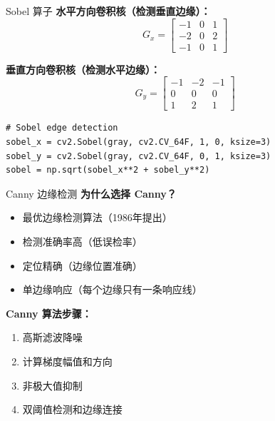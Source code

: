 \begin{frame}[fragile]{Sobel 算子}
    \textbf{水平方向卷积核（检测垂直边缘）：}
    $$
    G_x = \begin{bmatrix}
    -1 & 0 & 1 \\
    -2 & 0 & 2 \\
    -1 & 0 & 1
    \end{bmatrix}
    $$

    \textbf{垂直方向卷积核（检测水平边缘）：}
    $$
    G_y = \begin{bmatrix}
    -1 & -2 & -1 \\
     0 &  0 &  0 \\
     1 &  2 &  1
    \end{bmatrix}
    $$

    \begin{lstlisting}[basicstyle=\ttfamily\scriptsize]
# Sobel edge detection
sobel_x = cv2.Sobel(gray, cv2.CV_64F, 1, 0, ksize=3)
sobel_y = cv2.Sobel(gray, cv2.CV_64F, 0, 1, ksize=3)
sobel = np.sqrt(sobel_x**2 + sobel_y**2)
    \end{lstlisting}

\end{frame}

\begin{frame}{Canny 边缘检测}
    \textbf{为什么选择 Canny？}
    \begin{itemize}
        \item 最优边缘检测算法（1986年提出）
        \item 检测准确率高（低误检率）
        \item 定位精确（边缘位置准确）
        \item 单边缘响应（每个边缘只有一条响应线）
    \end{itemize}

    \vspace{0.3cm}

    \textbf{Canny 算法步骤：}
    \begin{enumerate}
        \item 高斯滤波降噪
        \item 计算梯度幅值和方向
        \item 非极大值抑制
        \item 双阈值检测和边缘连接
    \end{enumerate}
\end{frame}

